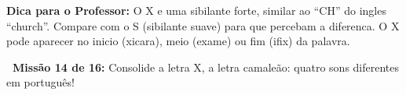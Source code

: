 \begin{dica}
\textbf{Dica para o Professor:} O X e uma sibilante forte, similar ao ``CH'' do ingles ``church''. Compare com o S (sibilante suave) para que percebam a diferenca. O X pode aparecer no inicio (xicara), meio (exame) ou fim (ifix) da palavra.
\end{dica}





\begin{missao}
\textbf{\faGamepad~Miss\~a{}o 14 de 16:} Consolide a letra X, a letra camale\~a{}o: quatro sons diferentes em portugu\^es!
\end{missao}

